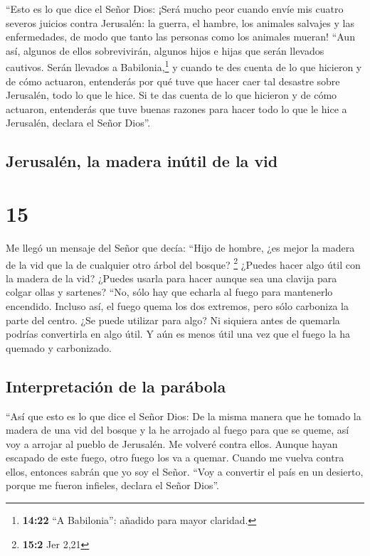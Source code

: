  ``Esto es lo que dice el Señor Dios: ¡Será mucho peor
cuando envíe mis cuatro severos juicios contra Jerusalén: la guerra, el
hambre, los animales salvajes y las enfermedades, de modo que tanto las
personas como los animales mueran!  ``Aun así, algunos de
ellos sobrevivirán, algunos hijos e hijas que serán llevados cautivos.
Serán llevados a Babilonia,\footnote{\textbf{14:22} ``A Babilonia'':
  añadido para mayor claridad.} y cuando te des cuenta de lo que
hicieron y de cómo actuaron, entenderás por qué tuve que hacer caer tal
desastre sobre Jerusalén, todo lo que le hice.  Si te das
cuenta de lo que hicieron y de cómo actuaron, entenderás que tuve buenas
razones para hacer todo lo que le hice a Jerusalén, declara el Señor
Dios''.

\hypertarget{jerusaluxe9n-la-madera-inuxfatil-de-la-vid}{%
\subsection{Jerusalén, la madera inútil de la
vid}\label{jerusaluxe9n-la-madera-inuxfatil-de-la-vid}}

\hypertarget{section-14}{%
\section{15}\label{section-14}}

 Me llegó un mensaje del Señor que decía: 
``Hijo de hombre, ¿es mejor la madera de la vid que la de cualquier otro
árbol del bosque? \footnote{\textbf{15:2} Jer 2,21} 
¿Puedes hacer algo útil con la madera de la vid? ¿Puedes usarla para
hacer aunque sea una clavija para colgar ollas y sartenes?
 ``No, sólo hay que echarla al fuego para mantenerlo
encendido. Incluso así, el fuego quema los dos extremos, pero sólo
carboniza la parte del centro. ¿Se puede utilizar para algo?
 Ni siquiera antes de quemarla podrías convertirla en algo
útil. Y aún es menos útil una vez que el fuego la ha quemado y
carbonizado.

\hypertarget{interpretaciuxf3n-de-la-paruxe1bola}{%
\subsection{Interpretación de la
parábola}\label{interpretaciuxf3n-de-la-paruxe1bola}}

 ``Así que esto es lo que dice el Señor Dios: De la misma
manera que he tomado la madera de una vid del bosque y la he arrojado al
fuego para que se queme, así voy a arrojar al pueblo de Jerusalén.
 Me volveré contra ellos. Aunque hayan escapado de este
fuego, otro fuego los va a quemar. Cuando me vuelva contra ellos,
entonces sabrán que yo soy el Señor.  ``Voy a convertir el
país en un desierto, porque me fueron infieles, declara el Señor Dios''.

